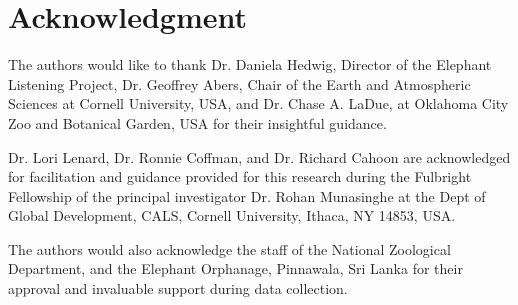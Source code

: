 \documentclass[applsci,article,accept,moreauthors,pdftex]{Definitions/mdpi}
\begin{document}
			
\section*{Acknowledgment}
The authors would like to thank Dr. Daniela Hedwig, Director of the Elephant Listening Project, Dr. Geoffrey Abers, Chair of the Earth and Atmospheric Sciences at Cornell University, USA, and Dr. Chase A. LaDue, at Oklahoma City Zoo and Botanical Garden, USA for their insightful guidance.\par
Dr. Lori Lenard, Dr. Ronnie Coffman, and Dr. Richard Cahoon are acknowledged for facilitation and guidance provided for this research during the Fulbright Fellowship of the principal investigator Dr. Rohan Munasinghe at the Dept of Global Development, CALS, Cornell University, Ithaca, NY 14853, USA.\par
The authors would also acknowledge the staff of the National Zoological Department, and the Elephant Orphanage, Pinnawala, Sri Lanka for their approval and invaluable support during data collection.
			
\end{document}
